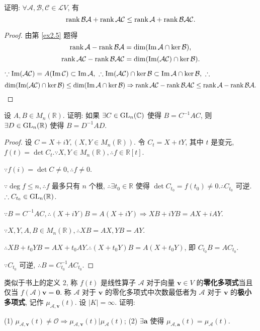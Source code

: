 \documentclass[color=black,device=normal,lang=cn,mode=geye]{elegantnote}
\begin{document}
\begin{exercise}%
    证明: $\forall\mathcal{A},\mathcal{B},\mathcal{C}\in\mathcal{L}V$, 有
    \[\operatorname{rank} \mathcal{BA}+\operatorname{rank} \mathcal{AC}\leq\operatorname{rank} \mathcal{A}+\operatorname{rank} \mathcal{BAC}.\]
\end{exercise}
\begin{proof}
    由第 \ref{ex2.5} 题得
    \[\operatorname{rank} \mathcal{A}-\operatorname{rank} \mathcal{BA}=\dim(\operatorname{Im} \mathcal{A}\cap\ker\mathcal{B}),\]
    \[\operatorname{rank} \mathcal{AC}-\operatorname{rank} \mathcal{BAC}=\dim(\operatorname{Im} (\mathcal{AC})\cap\ker\mathcal{B}).\]

    $\because\operatorname{Im} (\mathcal{AC})=A(\operatorname{Im} \mathcal{C})\subset\operatorname{Im} \mathcal{A},\ \therefore\operatorname{Im} (\mathcal{AC})\cap\ker\mathcal{B}\subset\operatorname{Im} \mathcal{A}\cap\ker\mathcal{B},\ \therefore$
    \[\dim(\operatorname{Im} (\mathcal{AC})\cap\ker\mathcal{B})\leq\dim(\operatorname{Im} \mathcal{A}\cap\ker\mathcal{B})\Rightarrow\operatorname{rank} \mathcal{AC}-\operatorname{rank} \mathcal{BAC}\leq\operatorname{rank} \mathcal{A}-\operatorname{rank} \mathcal{BA}.\qedhere\]
\end{proof}
\begin{exercise}%
    设 $A,B\in M_n(\mathbb{R})$. 证明: 如果 $\exists C\in \operatorname{GL} _n(\mathbb{C})$ 使得 $B=C^{-1}AC$, 则 $\exists D\in \operatorname{GL} _n(\mathbb{R})$ 使得 $B=D^{-1}AD$.
\end{exercise}
\begin{proof}
    设 $C=X+iY,(X,Y\in M_n(\mathbb{R}))$. 令 $C_t=X+tY$, 其中 $t$ 是变元, $f(t)=\det C_t.\because X,Y\in M_n(\mathbb{R}),\therefore f\in\mathbb{R}[t]$.
    
    $\because f(i)=\det C\neq0,\therefore f\neq0$.

    $\because\deg f\leq n,\therefore f$ 最多只有 $n$ 个根, $\therefore\exists t_0\in\mathbb{R}$ 使得 $\det C_{t_0}=f(t_0)\neq0.\therefore C_{t_0}$ 可逆. $\therefore C_{t_0}\in \operatorname{GL} _n(\mathbb{R})$.

    $\because B=C^{-1}AC,\therefore(X+iY)B=A(X+iY)\Rightarrow XB+iYB=AX+iAY$.

    $\because X,Y,A,B\in M_n(\mathbb{R}),\therefore XB=AX,YB=AY$.

    $\therefore XB+t_0YB=AX+t_0AY.\therefore(X+t_0Y)B=A(X+t_0Y)$, 即 $C_{t_0}B=AC_{t_0}$.

    $\because C_{t_0}$ 可逆, $\therefore B=C_{t_0}^{-1}AC_{t_0}$.
\end{proof}
\begin{exercise}%
    类似于书上的定义 2, 称 $f(t)$ 是线性算子 $\mathcal{A}$ 对于向量 $\boldsymbol{v}\in V$ 的\textbf{零化多项式}当且仅当 $f(\mathcal{A})\boldsymbol{v}=\boldsymbol{0}$. 称 $\mathcal{A}$ 对于 $\boldsymbol{v}$ 的零化多项式中次数最低者为 $\mathcal{A}$ 对于 $\boldsymbol{v}$ 的\textbf{极小多项式}, 记作 $\mu_{\mathcal{A},\boldsymbol{v}}(t)$. 设 $|K|=\infty$. 证明:

    (1) $\mu_{\mathcal{A},\boldsymbol{v}}(t)\neq\mathcal{O}\Rightarrow\mu_{\mathcal{A},\boldsymbol{v}}(t)|\mu_{\mathcal{A}}(t)$; (2) $\exists\boldsymbol{a}$ 使得 $\mu_{\mathcal{A},\boldsymbol{a}}(t)=\mu_{\mathcal{A}}(t)$.
\end{exercise}
\end{document}
